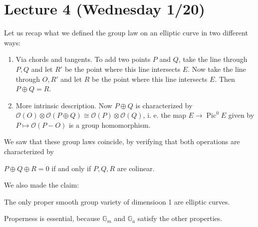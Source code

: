 \section{Lecture 4 (Wednesday 1/20)}
Let us recap what we defined the group law on an elliptic curve in two different ways:
\begin{enumerate}
\item Via chords and tangents. To add two points \( P \) and \( Q \), take the line through \( P,Q \) and let \( R' \) be the point where this line intersects \( E \). Now take the line through \( O,R' \) and let \( R \) be the point where this line intersects \( E \). Then \( P \oplus Q = R \).
\item More intrinsic description. Now \( P \oplus Q \) is characterized by \( \mathcal{O}(O) \otimes \mathcal{O} \left( P\oplus Q \right) \cong \mathcal{O}(P) \otimes \mathcal{O}(Q) \), i. e. the map \( E \to \operatorname{Pic}^0 E \) given by \( P \mapsto \mathcal{O}(P - O) \) is a group homomorphism.
\end{enumerate}
We saw that these group laws coincide, by verifying that both operations are characterized by
\begin{center}
  \( P \oplus Q \oplus R = 0 \) if and only if \( P,Q,R \) are colinear.
\end{center}
We also made the claim:
\begin{proposition}
  The only proper smooth group variety of dimensioon 1 are elliptic curves.
\end{proposition}
Properness is essential, because \( \mathbb{G}_m \) and \( \mathbb{G}_a \) satisfy the other properties.

